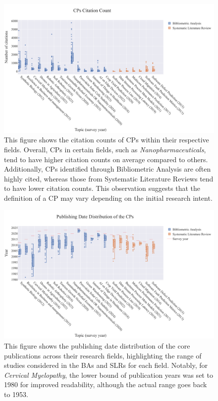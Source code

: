 \begin{figure}[!ht]
	\hspace*{.8cm}	
	\includegraphics[scale=0.4]{pics/citation-distribution.pdf}
	\caption[CPs Citation Count by Research Field]{This figure shows the citation counts of CPs within their respective fields. Overall, CPs in certain fields, such as \textit{Nanopharmaceuticals}, tend to have higher citation counts on average compared to others. Additionally, CPs identified through Bibliometric Analysis are often highly cited, whereas those from Systematic Literature Reviews tend to have lower citation counts. This observation suggests that the definition of a CP may vary depending on the initial research intent.}
	
	\label{fig:dataset-citation}
\end{figure}

\begin{figure}[!ht]
	\centering	
	\includegraphics[scale=0.4]{pics/year-distribution.pdf}
	\caption[Publishing Year of the CPs]{This figure shows the publishing date distribution of the core publications across their research fields, highlighting the range of studies considered in the BAs and SLRs for each field. Notably, for \textit{Cervical Myelopathy}, the lower bound of publication years was set to 1980 for improved readability, although the actual range goes back to 1953.}
	\label{fig:dataset-years}
\end{figure}


